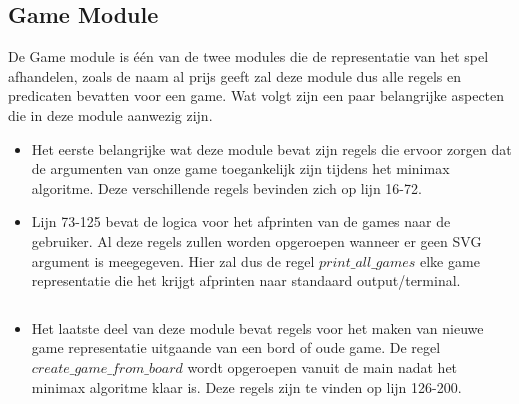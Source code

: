 \documentclass{article}
\begin{document}
\subsection{Game Module}
De Game module is één van de twee modules die de representatie van het spel afhandelen, zoals de naam al prijs geeft zal deze module dus alle regels en predicaten bevatten voor een game. Wat volgt zijn een paar belangrijke aspecten die in deze module aanwezig zijn.
\begin{itemize}
  \item Het eerste belangrijke wat deze module bevat zijn regels die ervoor zorgen dat de argumenten van onze game toegankelijk zijn tijdens het minimax algoritme. Deze verschillende regels bevinden zich op lijn 16-72.
  \item Lijn 73-125 bevat de logica voor het afprinten van de games naar de gebruiker. Al deze regels zullen worden opgeroepen wanneer er geen SVG argument is meegegeven. Hier zal dus de regel $print\_all\_games$ elke game representatie die het krijgt afprinten naar standaard output/terminal.
\inputminted[firstline=94, lastline=102, linenos, breaklines]{prolog}{/Users/Victor/Documents/UGent/3BI/Logisch/Project/project/src/game.pl}
\item Het laatste deel van deze module bevat regels voor het maken van nieuwe game representatie uitgaande van een bord of oude game. De regel $create\_game\_from\_board$ wordt opgeroepen vanuit de main nadat het minimax algoritme klaar is. Deze regels zijn te vinden op lijn 126-200.
\inputminted[firstline=147, lastline=152, linenos, breaklines]{prolog}{/Users/Victor/Documents/UGent/3BI/Logisch/Project/project/src/game.pl}

\end{itemize}
\end{document}
